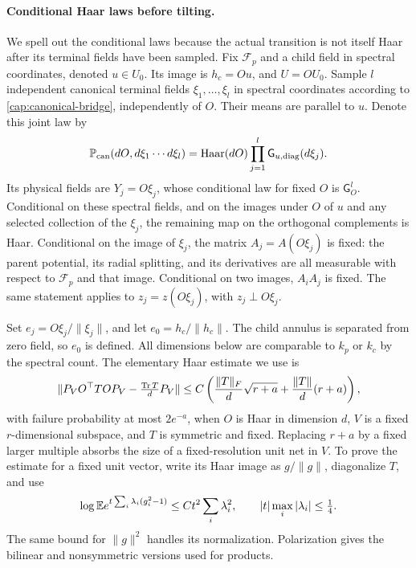 \paragraph{Conditional Haar laws before tilting.}
We spell out the conditional laws because the actual transition is not itself
Haar after its terminal fields have been sampled. Fix $\mathscr F_p$ and a
child field in spectral coordinates, denoted $u\in U_0$. Its image is
$h_c=Ou$, and $U=OU_0$. Sample $l$ independent canonical terminal fields
$\xi_1,\ldots,\xi_l$ in spectral coordinates according to
\eqref{cap:canonical-bridge}, independently of $O$. Their means are parallel
to \(u\). Denote this joint law by
\[
 \mathbb P_{\rm can}(dO,d\xi_1\cdots d\xi_l)
 =\operatorname{Haar}(dO)\prod_{j=1}^l
       \mathsf G_{u,\rm diag}(d\xi_j).
\]
Its physical fields are \(Y_j=O\xi_j\), whose conditional law for fixed
\(O\) is \(\mathsf G_O^l\). Conditional on these spectral fields, and on the images under \(O\)
of $u$ and any selected collection of the $\xi_j$, the remaining map on the
orthogonal complements is Haar. Conditional on the image of $\xi_j$, the
matrix $A_j=A(O\xi_j)$ is fixed: the parent potential, its radial splitting,
and its derivatives are all measurable with respect to $\mathscr F_p$ and
that image. Conditional on two images, $A_iA_j$ is fixed. The same statement
applies to $z_j=z(O\xi_j)$, with $z_j\perp O\xi_j$.

Set $e_j=O\xi_j/\|\xi_j\|$, and let $e_0=h_c/\|h_c\|$. The child annulus is
separated from zero field, so $e_0$ is defined. All dimensions below are
comparable to $k_p$ or $k_c$ by the spectral count. The elementary Haar
estimate we use is
\begin{equation}\label{cap:haar-compression}
 \|P_V O^\top T O P_V-\tfrac{\operatorname{Tr} T}{d}P_V\|
 \le C\left(\frac{\|T\|_F}{d}\sqrt{r+a}
                 +\frac{\|T\|}{d}(r+a)\right),
\end{equation}
with failure probability at most $2e^{-a}$, when $O$ is Haar in dimension $d$,
$V$ is a fixed $r$-dimensional subspace, and $T$ is symmetric and fixed.
Replacing $r+a$ by a fixed larger multiple absorbs the size of a
fixed-resolution unit net in $V$. To prove the estimate for a fixed unit
vector, write its Haar image as $g/\|g\|$, diagonalize $T$, and use
\begin{equation}
 \log\mathbb E e^{t\sum_i\lambda_i(g_i^2-1)}
 \le C t^2\sum_i\lambda_i^2,
 \qquad |t|\max_i|\lambda_i|\le\tfrac14.
 \label{cap:gaussian-quadratic-tail}
\end{equation}
The same bound for $\|g\|^2$ handles its normalization. Polarization gives
the bilinear and nonsymmetric versions used for products.

